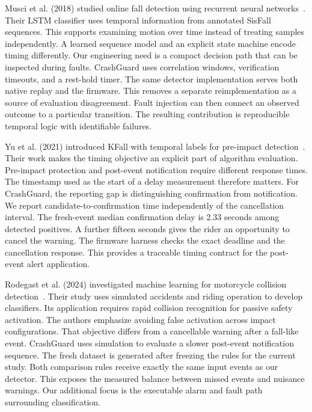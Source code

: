 \documentclass[10pt,a4paper]{article}
\begin{document}
Musci et al. (2018) studied online fall detection using recurrent neural networks~\cite{musci}. Their LSTM classifier uses temporal information from annotated SisFall sequences. This supports examining motion over time instead of treating samples independently. A learned sequence model and an explicit state machine encode timing differently. Our engineering need is a compact decision path that can be inspected during faults. CrashGuard uses correlation windows, verification timeouts, and a rest-hold timer. The same detector implementation serves both native replay and the firmware. This removes a separate reimplementation as a source of evaluation disagreement. Fault injection can then connect an observed outcome to a particular transition. The resulting contribution is reproducible temporal logic with identifiable failures.


Yu et al. (2021) introduced KFall with temporal labels for pre-impact detection~\cite{kfall}. Their work makes the timing objective an explicit part of algorithm evaluation. Pre-impact protection and post-event notification require different response times. The timestamp used as the start of a delay measurement therefore matters. For CrashGuard, the reporting gap is distinguishing confirmation from notification. We report candidate-to-confirmation time independently of the cancellation interval. The fresh-event median confirmation delay is 2.33 seconds among detected positives. A further fifteen seconds gives the rider an opportunity to cancel the warning. The firmware harness checks the exact deadline and the cancellation response. This provides a traceable timing contract for the post-event alert application.


Rodegast et al. (2024) investigated machine learning for motorcycle collision detection~\cite{rodegast2024}. Their study uses simulated accidents and riding operation to develop classifiers. Its application requires rapid collision recognition for passive safety activation. The authors emphasize avoiding false activation across impact configurations. That objective differs from a cancellable warning after a fall-like event. CrashGuard uses simulation to evaluate a slower post-event notification sequence. The fresh dataset is generated after freezing the rules for the current study. Both comparison rules receive exactly the same input events as our detector. This exposes the measured balance between missed events and nuisance warnings. Our additional focus is the executable alarm and fault path surrounding classification.
\end{document}
